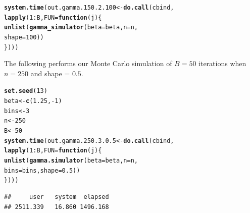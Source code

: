 \documentclass[11pt]{article}\usepackage[]{graphicx}\usepackage[]{color}
\makeatletter
\newcommand{\hlnum}[1]{\textcolor[rgb]{0.686,0.059,0.569}{#1}}%
\newcommand{\hlopt}[1]{\textcolor[rgb]{0,0,0}{#1}}%
\newcommand{\hlstd}[1]{\textcolor[rgb]{0.345,0.345,0.345}{#1}}%
\newcommand{\hlkwa}[1]{\textcolor[rgb]{0.161,0.373,0.58}{\textbf{#1}}}%
\newcommand{\hlkwb}[1]{\textcolor[rgb]{0.69,0.353,0.396}{#1}}%
\newcommand{\hlkwc}[1]{\textcolor[rgb]{0.333,0.667,0.333}{#1}}%
\newcommand{\hlkwd}[1]{\textcolor[rgb]{0.737,0.353,0.396}{\textbf{#1}}}%
\newenvironment{kframe}{%
 \def\at@end@of@kframe{}%
 \ifinner\ifhmode%
  \def\at@end@of@kframe{\end{minipage}}%
  \begin{minipage}{\columnwidth}%
 \fi\fi%
 \def\FrameCommand##1{\hskip\@totalleftmargin \hskip-\fboxsep
 \colorbox{shadecolor}{##1}\hskip-\fboxsep
     \hskip-\linewidth \hskip-\@totalleftmargin \hskip\columnwidth}%
 \MakeFramed {\advance\hsize-\width
   \@totalleftmargin\z@ \linewidth\hsize
   \@setminipage}}%
 {\par\unskip\endMakeFramed%
 \at@end@of@kframe}
\newenvironment{knitrout}{}{} %
\makeatother
\begin{document}
\begin{knitrout}
\color{fgcolor}\begin{kframe}
\begin{alltt}
\hlkwd{system.time}\hlstd{(out.gamma.150.2.100} \hlkwb{<-} \hlkwd{do.call}\hlstd{(cbind,}
  \hlkwd{lapply}\hlstd{(}\hlnum{1}\hlopt{:}\hlstd{B,} \hlkwc{FUN} \hlstd{=} \hlkwa{function}\hlstd{(}\hlkwc{j}\hlstd{)\{}
    \hlkwd{unlist}\hlstd{(}\hlkwd{gamma_simulator}\hlstd{(}\hlkwc{beta} \hlstd{= beta,} \hlkwc{n} \hlstd{= n,}
      \hlkwc{shape} \hlstd{=} \hlnum{100}\hlstd{))}
\hlstd{\})))}
\end{alltt}


{\ttfamily\noindent\bfseries\color{errorcolor}{\#\# Error in r[, l]/mad.predict.fun(out.mad, xx): non-numeric argument to binary operator}}

{\ttfamily\noindent\itshape\color{messagecolor}{\#\# Timing stopped at: 1.62 0 1.623}}\end{kframe}
\end{knitrout}







The following performs our Monte Carlo simulation of $B = 50$ iterations 
when $n = 250$ and shape = $0.5$.

\begin{knitrout}
\color{fgcolor}\begin{kframe}
\begin{alltt}
\hlkwd{set.seed}\hlstd{(}\hlnum{13}\hlstd{)}
\hlstd{beta} \hlkwb{<-} \hlkwd{c}\hlstd{(}\hlnum{1.25}\hlstd{,} \hlopt{-}\hlnum{1}\hlstd{)}
\hlstd{bins} \hlkwb{<-} \hlnum{3}
\hlstd{n} \hlkwb{<-} \hlnum{250}
\hlstd{B} \hlkwb{<-} \hlnum{50}
\hlkwd{system.time}\hlstd{(out.gamma.250.3.0.5} \hlkwb{<-} \hlkwd{do.call}\hlstd{(cbind,}
  \hlkwd{lapply}\hlstd{(}\hlnum{1}\hlopt{:}\hlstd{B,} \hlkwc{FUN} \hlstd{=} \hlkwa{function}\hlstd{(}\hlkwc{j}\hlstd{)\{}
    \hlkwd{unlist}\hlstd{(}\hlkwd{gamma.simulator}\hlstd{(}\hlkwc{beta} \hlstd{= beta,} \hlkwc{n} \hlstd{= n,}
      \hlkwc{bins} \hlstd{= bins,} \hlkwc{shape} \hlstd{=} \hlnum{0.5}\hlstd{))}
\hlstd{\})))}
\end{alltt}
\begin{verbatim}
##     user   system  elapsed 
## 2511.339   16.860 1496.168
\end{verbatim}
\end{kframe}
\end{knitrout}
\end{document}
